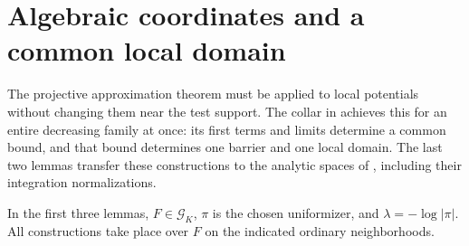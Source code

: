 \documentclass[11pt,reqno]{amsart}
\theoremstyle{definition}
\theoremstyle{remark}
\numberwithin{equation}{section}
\begin{document}
\section{Algebraic coordinates and a common local domain}
\label{sec:local-geometry}

The projective approximation theorem must be applied to local
potentials without changing them near the test support. The collar
in  achieves this for an entire decreasing
family at once: its first terms and limits determine a common bound,
and that bound determines one barrier and one local domain.
The last two lemmas transfer these constructions to the analytic
spaces of , including their integration
normalizations.

In the first three lemmas, \(F\in\mathcal G_K\),
\(\pi\) is the chosen uniformizer, and \(\lambda=-\log|\pi|\).
All constructions take place over \(F\) on the indicated ordinary
neighborhoods.
\end{document}
